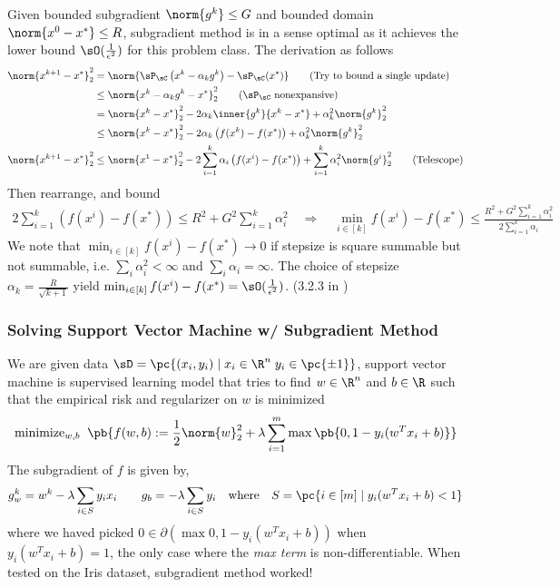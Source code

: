 \documentclass[../summary.tex]{subfiles}
\begin{document}
Given bounded subgradient $\norm{g^k}\leq G$ and bounded domain $\norm{x^0 - x^*} \leq R$, subgradient method is in a sense optimal as it achieves the lower bound $\sO(\frac{1}{\epsilon^2})$ for this problem class. The derivation as follows
\begin{align*}
    \norm{x^{k+1} - x^*}_2^2
        &= \norm{\sP_{\sC}\left(x^k - \alpha_k g^k\right) -  \sP_{\sC}(x^*)} 
            \tag{Try to bound a single update} \\
        &\leq \norm{x^k - \alpha_k g^k - x^*}_2^2
                \tag{$\sP_{\sC}$ nonexpansive} \\ 
        &= \norm{x^k-x^*}_2^2 - 2\alpha_k \inner{g^k}{x^k-x^*} + \alpha_k^2 \norm{g^k}_2^2 \\
        &\leq \norm{x^k-x^*}_2^2 - 2\alpha_k \left( f(x^k) - f(x^*) \right) + \alpha_k^2 \norm{g^k}_2^2 \\
    \norm{x^{k+1} - x^*}_2^2
        &\leq \norm{x^1 - x^*}_2^2 - 2\sum_{i=1}^{k} \alpha_i\left(f(x^i) - f(x^*)\right) + \sum_{i=1}^k \alpha_i^2 \norm{g^i}_2^2
            \tag{Telescope} 
\end{align*} 
Then rearrange, and bound 
\begin{align*} 
    2\sum_{i=1}^k \left(f(x^i) - f(x^*)\right)
        \leq R^2 + G^2 \sum_{i=1}^k \alpha_i^2 \quad\Rightarrow\quad
    \min_{i\in[k]} f(x^i) - f(x^*) 
        \leq \frac{R^2 + G^2\sum_{i=1}^k \alpha_i^2}{2\sum_{i=1}^k \alpha_i}
\end{align*} 
We note that $\min_{i\in[k]} f(x^i) - f(x^*) \to 0$ if stepsize is square summable but not summable, i.e. $\sum_i \alpha_i^2 < \infty$ and $\sum_i \alpha_i = \infty$. The choice of stepsize $\alpha_k = \frac{R}{\sqrt{k+1}}$ yield $\min_{i\in[k]} f(x^i) - f(x^*) = \sO(\frac{1}{\epsilon^2})$. (3.2.3 in \cite{nesterovIntroductoryLecturesConvex2004})
 
 
\subsubsection{Solving Support Vector Machine w/ Subgradient Method}

We are given data $\sD = \pc{(x_i,y_i) \mid x_i\in\R^n \; y_i \in \pc{\pm 1}}$, support vector machine is supervised learning model that tries to find $w\in\R^n$ and $b\in\R$ such that the empirical risk and regularizer on $w$ is minimized
\begin{align*}
    \text{minimize}_{w,b} \;\;
        \pb{
            f(w,b) := 
            \frac{1}{2} \norm{w}_2^2 + \lambda \sum_{i=1}^m \max\pb{0, 1 - y_i(w^Tx_i + b)} 
        }
\end{align*}
The subgradient of $f$ is given by,
\begin{align*}
    g_w^k
        = w^k - \lambda \sum_{i \in S} y_i x_i
    \qquad
    g_b
        = -\lambda \sum_{i\in S} y_i
    \quad\text{where}\quad
    S = \pc{i\in [m] \mid y_i(w^Tx_i + b) < 1}
\end{align*}
where we haved picked $0\in\partial (\max{0, 1- y_i(w^Tx_i + b)})$ when $y_i(w^Tx_i + b) = 1$, the only case where the \textit{max term} is non-differentiable. When tested on the Iris dataset, subgradient method worked!
\end{document}
